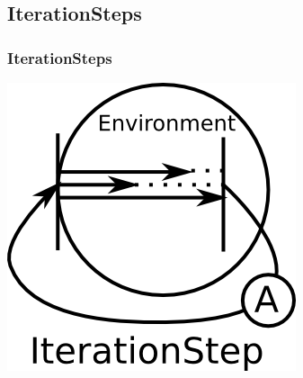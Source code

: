 \subsection{IterationSteps}
\begin{frame}
  \frametitle{IterationSteps}
  \includegraphics[width=\textwidth/2]{Images/iteration.png}
\end{frame}
